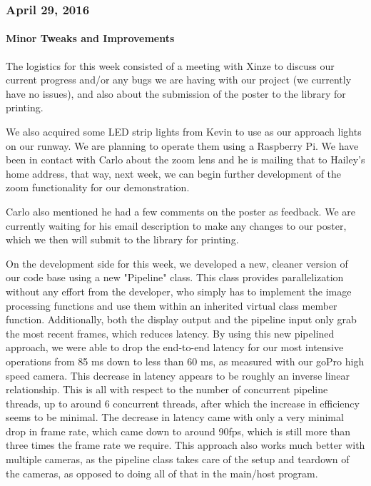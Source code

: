 \subsubsection{April 29, 2016}
\paragraph{Minor Tweaks and Improvements}
The logistics for this week consisted of a meeting with Xinze to discuss our current progress and/or any bugs we are having with our project (we currently have no issues), and also about the submission of the poster to the library for printing.
\par
We also acquired some LED strip lights from Kevin to use as our approach lights on our runway. We are planning to operate them using a Raspberry Pi. We have been in contact with Carlo about the zoom lens and he is mailing that to Hailey's home address, that way, next week, we can begin further development of the zoom functionality for our demonstration. 
\par
Carlo also mentioned he had a few comments on the poster as feedback. We are currently waiting for his email description to make any changes to our poster, which we then will submit to the library for printing. 
\par
On the development side for this week, we developed a new, cleaner version of our code base using a new "Pipeline" class. This class provides parallelization without any effort from the developer, who simply has to implement the image processing functions and use them within an inherited virtual class member function. Additionally, both the display output and the pipeline input only grab the most recent frames, which reduces latency. By using this new pipelined approach, we were able to drop the end-to-end latency for our most intensive operations from 85 ms down to less than 60 ms, as measured with our goPro high speed camera. This decrease in latency appears to be roughly an inverse linear relationship. This is all with respect to the number of concurrent pipeline threads, up to around 6 concurrent threads, after which the increase in efficiency seems to be minimal. The decrease in latency came with only a very minimal drop in frame rate, which came down to around 90fps, which is still more than three times the frame rate we require. This approach also works much better with multiple cameras, as the pipeline class takes care of the setup and teardown of the cameras, as opposed to doing all of that in the main/host program.\\

